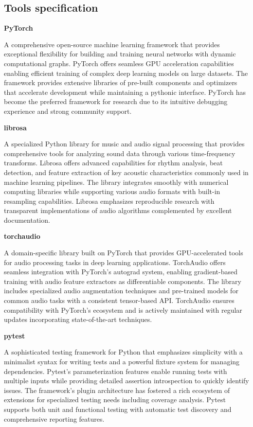 \documentclass[
    bindingoffset=5mm,  %
    footnoteindent=3mm, %
    hyphenation=true    %
]{src/wut-thesis}
\begin{document}
\subsection{Tools specification}
\begin{description}
\item \textbf{PyTorch}

A comprehensive open-source machine learning framework that provides exceptional flexibility for building and training neural networks with dynamic computational graphs. PyTorch offers seamless GPU acceleration capabilities enabling efficient training of complex deep learning models on large datasets. The framework provides extensive libraries of pre-built components and optimizers that accelerate development while maintaining a pythonic interface. PyTorch has become the preferred framework for research due to its intuitive debugging experience and strong community support.

\item \textbf{librosa}

A specialized Python library for music and audio signal processing that provides comprehensive tools for analyzing sound data through various time-frequency transforms. Librosa offers advanced capabilities for rhythm analysis, beat detection, and feature extraction of key acoustic characteristics commonly used in machine learning pipelines. The library integrates smoothly with numerical computing libraries while supporting various audio formats with built-in resampling capabilities. Librosa emphasizes reproducible research with transparent implementations of audio algorithms complemented by excellent documentation.

\item \textbf{torchaudio}

A domain-specific library built on PyTorch that provides GPU-accelerated tools for audio processing tasks in deep learning applications. TorchAudio offers seamless integration with PyTorch's autograd system, enabling gradient-based training with audio feature extractors as differentiable components. The library includes specialized audio augmentation techniques and pre-trained models for common audio tasks with a consistent tensor-based API. TorchAudio ensures compatibility with PyTorch's ecosystem and is actively maintained with regular updates incorporating state-of-the-art techniques.

\item \textbf{pytest}

A sophisticated testing framework for Python that emphasizes simplicity with a minimalist syntax for writing tests and a powerful fixture system for managing dependencies. Pytest's parameterization features enable running tests with multiple inputs while providing detailed assertion introspection to quickly identify issues. The framework's plugin architecture has fostered a rich ecosystem of extensions for specialized testing needs including coverage analysis. Pytest supports both unit and functional testing with automatic test discovery and comprehensive reporting features.


\end{description}
\end{document}
